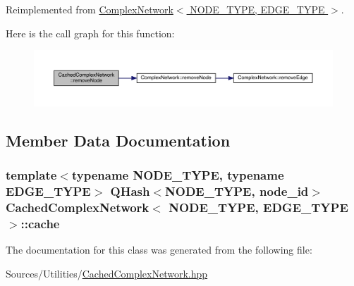 Reimplemented from \hyperlink{class_complex_network_a33f2b4528cc31296ede98be7e6dcd600}{Complex\+Network$<$ N\+O\+D\+E\+\_\+\+T\+Y\+P\+E, E\+D\+G\+E\+\_\+\+T\+Y\+P\+E $>$}.



Here is the call graph for this function\+:\nopagebreak
\begin{figure}[H]
\begin{center}
\leavevmode
\includegraphics[width=350pt]{class_cached_complex_network_a800aa02b94aa4bb73227e139cb246ddf_cgraph}
\end{center}
\end{figure}




\subsection{Member Data Documentation}
\hypertarget{class_cached_complex_network_ad0ac80eabd1a95fec5134a3fcbbe2f50}{
\subsubsection[{cache}]{\setlength{\rightskip}{0pt plus 5cm}template$<$typename N\+O\+D\+E\+\_\+\+T\+Y\+P\+E, typename E\+D\+G\+E\+\_\+\+T\+Y\+P\+E$>$ Q\+Hash$<$N\+O\+D\+E\+\_\+\+T\+Y\+P\+E, {\bf node\+\_\+id}$>$ {\bf Cached\+Complex\+Network}$<$ N\+O\+D\+E\+\_\+\+T\+Y\+P\+E, E\+D\+G\+E\+\_\+\+T\+Y\+P\+E $>$\+::cache\hspace{0.3cm}{\ttfamily [private]}}}\label{class_cached_complex_network_ad0ac80eabd1a95fec5134a3fcbbe2f50}


The documentation for this class was generated from the following file\+:\begin{DoxyCompactItemize}
\item 
Sources/\+Utilities/\hyperlink{_cached_complex_network_8hpp}{Cached\+Complex\+Network.\+hpp}\end{DoxyCompactItemize}
